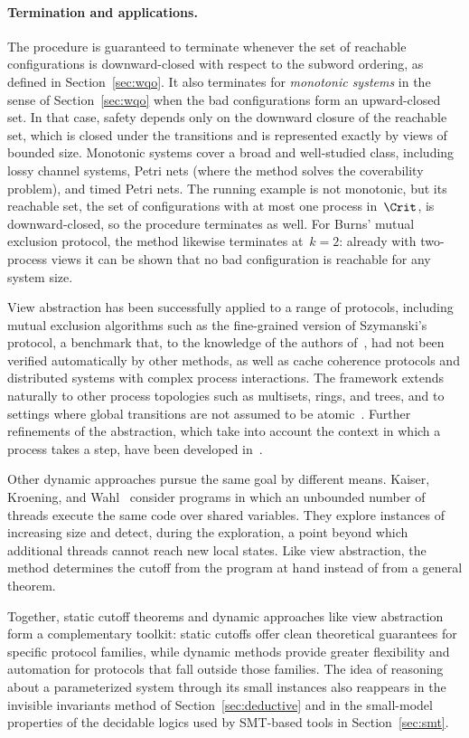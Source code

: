 \paragraph{Termination and applications.}
The procedure is guaranteed to terminate whenever the set of reachable
configurations is downward-closed with respect to the subword ordering, as
defined in Section~\ref{sec:wqo}. It also terminates for \emph{monotonic
systems} in the sense of Section~\ref{sec:wqo} when the bad configurations
form an upward-closed set. In that case, safety depends only on the downward
closure of the reachable set, which is closed under the transitions and is
represented exactly by views of bounded size. Monotonic systems cover a broad
and well-studied class, including lossy channel systems, Petri nets (where the
method solves the coverability problem), and timed Petri nets. The running
example is not monotonic, but its reachable set, the set of configurations
with at most one process in~$\Crit$, is downward-closed, so the procedure
terminates as well. For Burns' mutual exclusion protocol, the method likewise terminates at~$k =
2$: already with two-process views it can be shown that no bad configuration
is reachable for any system size.

View abstraction has been successfully applied to a range of protocols,
including mutual exclusion algorithms such as the fine-grained version of
Szymanski's protocol, a benchmark that, to the knowledge of the authors
of~\cite{AHH16}, had not been verified automatically by other methods, as well as cache coherence protocols and distributed
systems with complex process interactions. The framework extends naturally to
other process topologies such as multisets, rings, and trees, and to settings
where global transitions are not assumed to be atomic~\cite{AHH13,AHH16}.
Further refinements of the abstraction, which take into account the context in
which a process takes a step, have been developed in~\cite{AHH14}.

Other dynamic approaches pursue the same goal by different means. Kaiser,
Kroening, and Wahl~\cite{KKW10} consider programs in which an unbounded number
of threads execute the same code over shared variables. They explore instances
of increasing size and detect, during the exploration, a point beyond which
additional threads cannot reach new local states. Like view abstraction, the
method determines the cutoff from the program at hand instead of from a
general theorem.

Together, static cutoff theorems and dynamic approaches like view abstraction
form a complementary toolkit: static cutoffs offer clean theoretical
guarantees for specific protocol families, while dynamic methods
provide greater flexibility and automation for protocols that fall outside
those families. The idea of reasoning about a parameterized system through
its small instances also reappears in the invisible invariants method of
Section~\ref{sec:deductive} and in the small-model properties of the decidable
logics used by SMT-based tools in Section~\ref{sec:smt}.
